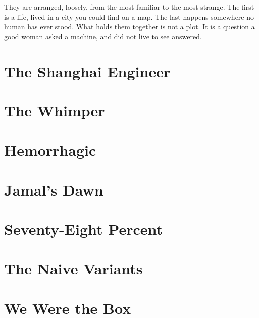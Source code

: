 \documentclass[11pt,twoside]{book}
\begin{document}
\medskip

\noindent They are arranged, loosely, from the most familiar to the most strange. The first is a life, lived in a city you could find on a map. The last happens somewhere no human has ever stood. What holds them together is not a plot. It is a question a good woman asked a machine, and did not live to see answered.

\clearpage

\tableofcontents
\clearpage

\mainmatter
\pagestyle{main}


\chapter{The Shanghai Engineer}


\chapter{The Whimper}


\chapter{Hemorrhagic}


\chapter{Jamal's Dawn}


\chapter{Seventy-Eight Percent}


\chapter{The Naive Variants}


\chapter{We Were the Box}

\end{document}
